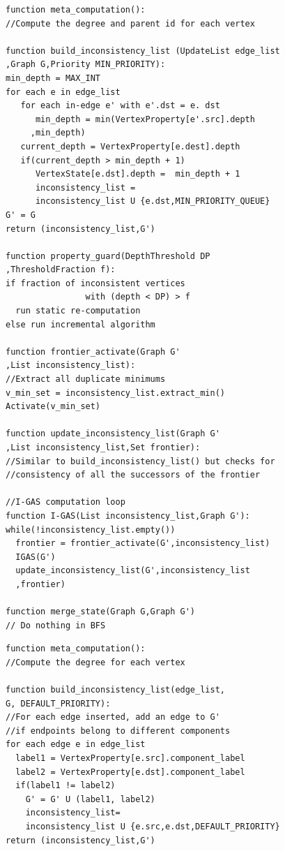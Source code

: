 \iffalse
\begin{figure}[!htb]
\begin{minipage}{0.6\columnwidth}
\begin{lstlisting}[caption=\textbf{BFS in EvoGraph.},captionpos='b',label={lst:mm_bfs}, basicstyle={\tiny\sffamily\bfseries}, numberstyle=\tiny]
function meta_computation():
//Compute the degree and parent id for each vertex

function build_inconsistency_list (UpdateList edge_list
,Graph G,Priority MIN_PRIORITY):
min_depth = MAX_INT
for each e in edge_list 
   for each in-edge e' with e'.dst = e. dst
      min_depth = min(VertexProperty[e'.src].depth
     ,min_depth)
   current_depth = VertexProperty[e.dest].depth
   if(current_depth > min_depth + 1)
      VertexState[e.dst].depth =  min_depth + 1
      inconsistency_list = 
      inconsistency_list U {e.dst,MIN_PRIORITY_QUEUE}
G' = G
return (inconsistency_list,G') 

function property_guard(DepthThreshold DP
,ThresholdFraction f):
if fraction of inconsistent vertices 
				with (depth < DP) > f
  run static re-computation
else run incremental algorithm

function frontier_activate(Graph G'
,List inconsistency_list):
//Extract all duplicate minimums
v_min_set = inconsistency_list.extract_min()
Activate(v_min_set)

function update_inconsistency_list(Graph G'
,List inconsistency_list,Set frontier):
//Similar to build_inconsistency_list() but checks for 
//consistency of all the successors of the frontier

//I-GAS computation loop
function I-GAS(List inconsistency_list,Graph G'):
while(!inconsistency_list.empty())
  frontier = frontier_activate(G',inconsistency_list)
  IGAS(G')
  update_inconsistency_list(G',inconsistency_list
  ,frontier) 

function merge_state(Graph G,Graph G')
// Do nothing in BFS

\end{lstlisting}
\end{minipage}
\hfill
\begin{minipage}{0.5\columnwidth}
\begin{lstlisting}[caption=\textbf{Connected Components  in EvoGraph.}, captionpos='b',label={lst:mm_cc}, basicstyle={\tiny\sffamily\bfseries},numberstyle=\tiny]
function meta_computation():
//Compute the degree for each vertex

function build_inconsistency_list(edge_list,
G, DEFAULT_PRIORITY):
//For each edge inserted, add an edge to G' 
//if endpoints belong to different components
for each edge e in edge_list
  label1 = VertexProperty[e.src].component_label
  label2 = VertexProperty[e.dst].component_label
  if(label1 != label2)
    G' = G' U (label1, label2)
    inconsistency_list= 
    inconsistency_list U {e.src,e.dst,DEFAULT_PRIORITY}
return (inconsistency_list,G') 


\end{lstlisting}
\end{minipage}
\end{figure}
